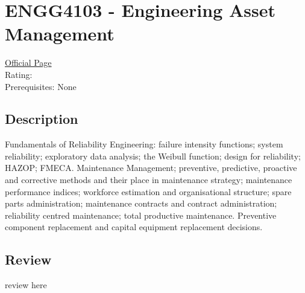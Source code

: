 \hypertarget{ENGG4103}{\section{ENGG4103 - Engineering Asset Management}}

\large
\textcolor{turbo_purple}{\href{https://my.uq.edu.au/programs-courses/course.html?course_code=ENGG4103}{Official Page}} \\
Rating: \cstar\cstar\cstar\cstar\ostar \\
Prerequisites: None

\normalsize
\subsection*{Description}
Fundamentals of Reliability Engineering: failure intensity functions; system reliability; exploratory data analysis; the Weibull function; design for reliability; HAZOP; FMECA.
Maintenance Management; preventive, predictive, proactive and corrective methods and their place in maintenance strategy; maintenance performance indices; workforce estimation and organisational structure; spare parts administration; maintenance contracts and contract administration; reliability centred maintenance; total productive maintenance.
Preventive component replacement and capital equipment replacement decisions.

\subsection*{Review}
review here
